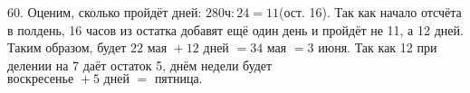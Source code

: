 60. Оценим, сколько пройдёт дней: $280\text{ч}:24=11$(ост. 16). Так как начало отсчёта в полдень, 16 часов из остатка добавят ещё один день и пройдёт не 11, а 12 дней. Таким образом, будет $22\text{ мая }+12\text{ дней }=34\text{ мая }=3\text{ июня}.$ Так как 12 при делении на 7 даёт остаток 5, днём недели будет $\text{воскресенье }+5\text{ дней }=\text{ пятница.}$\\
